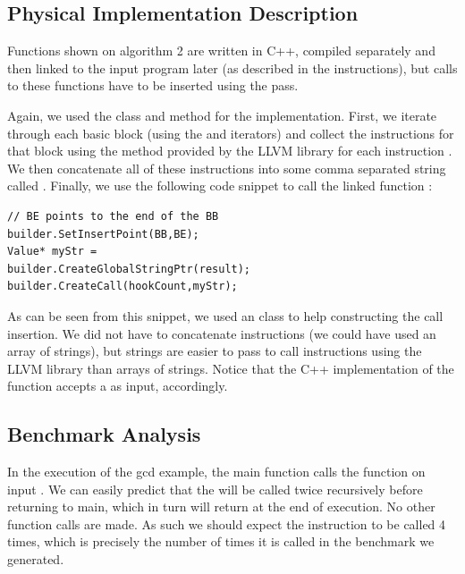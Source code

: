 \subsection{Physical Implementation Description}

Functions shown on algorithm 2 are written in C++, compiled separately and then linked to the input program later (as described in the instructions), but calls to these functions have to be inserted using the  pass.

Again, we used the  class and  method for the implementation. First, we iterate through each basic block (using the  and  iterators) and collect the instructions for that block using the  method provided by the LLVM library for each instruction . We then concatenate all of these instructions into some comma separated string called . Finally, we use the following code snippet to call the linked function :

\begin{frame}[fragile]
\begin{lstlisting}
// BE points to the end of the BB
builder.SetInsertPoint(BB,BE);
Value* myStr = 
builder.CreateGlobalStringPtr(result);
builder.CreateCall(hookCount,myStr);
\end{lstlisting}
\end{frame}
As can be seen from this snippet, we used an  class to help constructing the call insertion. We did not have to concatenate instructions (we could have used an array of strings), but strings are easier to pass to call instructions using the LLVM library than arrays of strings. Notice that the C++ implementation of the  function accepts a  as input, accordingly.

\subsection{Benchmark Analysis}

In the execution of the gcd example, the main function calls the  function on input . We can easily predict that the  will be called twice recursively before returning to main, which in turn will return at the end of execution. No other function calls are made. As such we should expect the  instruction to be called 4 times, which is precisely the number of times it is called in the benchmark we generated.
